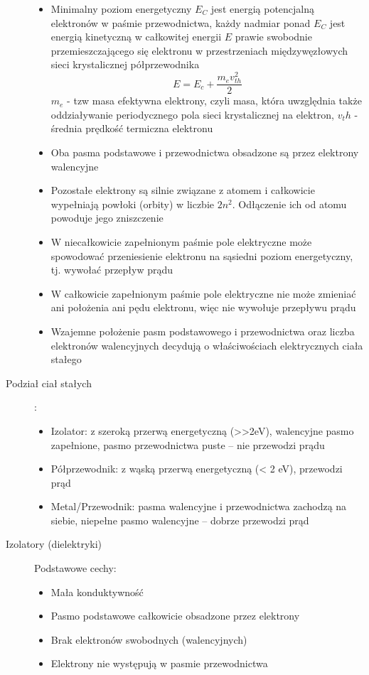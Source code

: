 \documentclass[a4paper,11pt]{article}
\begin{document}
\begin{description}
\begin{itemize}
  \item Minimalny poziom energetyczny $E_C$ jest energią potencjalną elektronów w paśmie przewodnictwa, każdy nadmiar ponad $E_C$ jest energią kinetyczną w całkowitej energii $E$ prawie swobodnie przemieszczającego się elektronu w przestrzeniach międzywęzłowych sieci krystalicznej półprzewodnika
    $$E = E_c+\frac{m_ev^2_{th}}{2}$$
    $m_e$ - tzw masa efektywna elektrony, czyli masa, która uwzględnia także oddziaływanie periodycznego pola sieci krystalicznej na elektron, $v_th$ - średnia prędkość termiczna elektronu
  \item Oba pasma podstawowe i przewodnictwa obsadzone są przez elektrony walencyjne
  \item Pozostałe elektrony są silnie związane z atomem i całkowicie wypełniają powłoki (orbity) w liczbie $2n^2$. Odłączenie ich od atomu powoduje jego zniszczenie
  \item W niecałkowicie zapełnionym paśmie pole elektryczne może spowodować przeniesienie elektronu na sąsiedni poziom energetyczny, tj. wywołać przepływ prądu
  \item W całkowicie zapełnionym paśmie pole elektryczne nie może zmieniać ani położenia ani pędu elektronu, więc nie wywołuje przepływu prądu 
  \item Wzajemne położenie pasm podstawowego i przewodnictwa oraz liczba elektronów walencyjnych decydują o właściwościach elektrycznych ciała stałego
  \end{itemize}
\item[Podział ciał stałych]:
  \begin{itemize}
  \item Izolator: z szeroką przerwą energetyczną (>>2eV), walencyjne pasmo zapełnione, pasmo przewodnictwa puste -- nie przewodzi prądu
  \item Półprzewodnik: z wąską przerwą energetyczną (< 2 eV), przewodzi prąd
  \item Metal/Przewodnik: pasma walencyjne i przewodnictwa zachodzą na siebie, niepełne pasmo walencyjne -- dobrze przewodzi prąd 
  \end{itemize}
\item[Izolatory (dielektryki)] Podstawowe cechy:
  \begin{itemize}
  \item Mała konduktywność
  \item Pasmo podstawowe całkowicie obsadzone przez elektrony
  \item Brak elektronów swobodnych (walencyjnych)
  \item Elektrony nie występują w pasmie przewodnictwa

\end{itemize}
\end{description}
\end{document}
